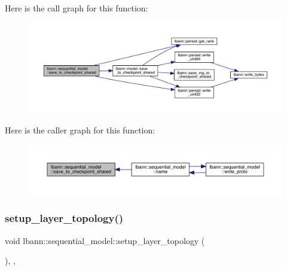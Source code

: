 Here is the call graph for this function\+:\nopagebreak
\begin{figure}[H]
\begin{center}
\leavevmode
\includegraphics[width=350pt]{classlbann_1_1sequential__model_a226032d9890b8770c6fca54bf70d69eb_cgraph}
\end{center}
\end{figure}
Here is the caller graph for this function\+:\nopagebreak
\begin{figure}[H]
\begin{center}
\leavevmode
\includegraphics[width=350pt]{classlbann_1_1sequential__model_a226032d9890b8770c6fca54bf70d69eb_icgraph}
\end{center}
\end{figure}
\mbox{\label{classlbann_1_1sequential__model_a3801a58530388fb6a8cb3e1c018e827d}} 
\subsubsection{\texorpdfstring{setup\+\_\+layer\+\_\+topology()}{setup\_layer\_topology()}}
{\footnotesize\ttfamily void lbann\+::sequential\+\_\+model\+::setup\+\_\+layer\+\_\+topology (\begin{DoxyParamCaption}{ }\end{DoxyParamCaption})\hspace{0.3cm}{\ttfamily [override]}, {\ttfamily [protected]}, {\ttfamily [virtual]}}

